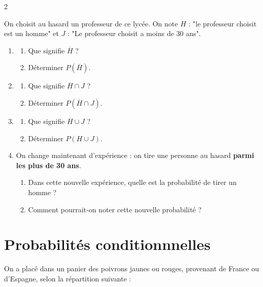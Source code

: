 \documentclass[10pt,a4paper]{article}
\begin{document}
\begin{multicols}{2}
\begin{exo}
    On choisit au hasard un professeur de ce lycée. On note \(H\) : "le professeur choisit est un homme" et \(J\) : "Le professeur choisit a moins de 30 ans".
    \begin{enumerate}
        \item \begin{enumerate}
            \item Que signifie \(\overline{H}\) ?
            \item Déterminer \(P(\overline{H})\).
        \end{enumerate}
        \item \begin{enumerate}
            \item Que signifie \(\overline{H} \cap J\) ?
            \item Déterminer \(P(\overline{H} \cap J)\).
        \end{enumerate}
        \item \begin{enumerate}
            \item Que signifie \(H\cup J\) ?
            \item Déterminer \(P(H \cup J)\).
        \end{enumerate}
        \item On change maintenant d'expérience : on tire une personne au hasard \textbf{parmi les plus de 30 ans}.
        \begin{enumerate}
            \item Dans cette nouvelle expérience, quelle est la probabilité de tirer un homme ?
            \item Comment pourrait-on noter cette nouvelle probabilité ?
        \end{enumerate}
    \end{enumerate}
\end{exo}


\section{Probabilités conditionnnelles}

\begin{exo}[][]
On a placé dans un panier des poivrons jaunes ou rouges, provenant de France ou d'Espagne, selon la répartition suivante :


\end{exo}
\end{multicols}
\end{document}
